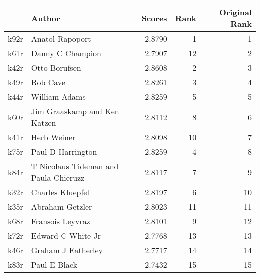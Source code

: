 \begin{tabular}{llrrr}
\toprule
{} &                                 Author &  Scores &  Rank &  Original Rank \\
\midrule
k92r &                        Anatol Rapoport &  2.8790 &     1 &              1 \\
k61r &                       Danny C Champion &  2.7907 &    12 &              2 \\
k42r &                          Otto Borufsen &  2.8608 &     2 &              3 \\
k49r &                               Rob Cave &  2.8261 &     3 &              4 \\
k44r &                          William Adams &  2.8259 &     5 &              5 \\
k60r &           Jim Graaskamp and Ken Katzen &  2.8112 &     8 &              6 \\
k41r &                            Herb Weiner &  2.8098 &    10 &              7 \\
k75r &                      Paul D Harrington &  2.8259 &     4 &              8 \\
k84r &  T Nicolaus Tideman and Paula Chieruzz &  2.8117 &     7 &              9 \\
k32r &                       Charles Kluepfel &  2.8197 &     6 &             10 \\
k35r &                        Abraham Getzler &  2.8023 &    11 &             11 \\
k68r &                       Fransois Leyvraz &  2.8101 &     9 &             12 \\
k72r &                      Edward C White Jr &  2.7768 &    13 &             13 \\
k46r &                     Graham J Eatherley &  2.7717 &    14 &             14 \\
k83r &                           Paul E Black &  2.7432 &    15 &             15 \\
\bottomrule
\end{tabular}
